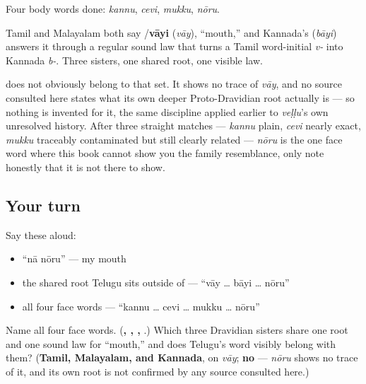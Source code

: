 Four body words done: \emph{kannu}, \emph{cevi}, \emph{mukku}, \emph{nōru}.

\begin{cousinweb}
Tamil and Malayalam both say \textbf{}/\textbf{vāyi} (\emph{vāy}), \textquotedblleft{}mouth,\textquotedblright{} and Kannada's \textbf{} (\emph{bāyi}) answers it through a regular sound law that turns a Tamil word-initial \emph{v-} into Kannada \emph{b-}. Three sisters, one shared root, one visible law.

\textbf{} does not obviously belong to that set. It shows no trace of \emph{vāy}, and no source consulted here states what its own deeper Proto-Dravidian root actually is — so nothing is invented for it, the same discipline applied earlier to \emph{veḷḷu}'s own unresolved history. After three straight matches — \emph{kannu} plain, \emph{cevi} nearly exact, \emph{mukku} traceably contaminated but still clearly related — \emph{nōru} is the one face word where this book cannot show you the family resemblance, only note honestly that it is not there to show.
\end{cousinweb}

\subsection*{Your turn}
Say these aloud:

\begin{itemize}
\raggedright
  \item \textquotedblleft{}nā nōru\textquotedblright{} — my mouth
  \item the shared root Telugu sits outside of — \textquotedblleft{}vāy … bāyi … nōru\textquotedblright{}
  \item all four face words — \textquotedblleft{}kannu … cevi … mukku … nōru\textquotedblright{}
\end{itemize}

\begin{tcolorbox}[breakable,colback=teal!4,colframe=teal!35!black,title={Before you move on}]
Name all four face words. (\textbf{, , , }.) Which three Dravidian sisters share one root and one sound law for \textquotedblleft{}mouth,\textquotedblright{} and does Telugu's word visibly belong with them? (\textbf{Tamil, Malayalam, and Kannada}, on \emph{vāy}; \textbf{no} — \emph{nōru} shows no trace of it, and its own root is not confirmed by any source consulted here.)
\end{tcolorbox}
